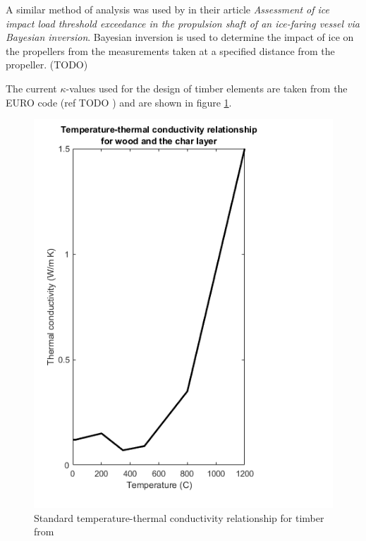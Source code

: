 	A similar method of analysis was used by \cite{DeKoker:2021} in their article \textit{Assessment of ice impact load threshold exceedance in the propulsion shaft of an ice-faring vessel via Bayesian inversion}. Bayesian inversion is used to determine the impact of ice on the propellers from the measurements taken at a specified distance from the propeller. (TODO)

	
	The current $\kappa$-values used for the design of timber elements are taken from the EURO code (ref TODO \citep{Euro:2004}) and are shown in figure \ref{kvalue_fig}.  
	\begin{figure}[H]
	\label{kvalue_fig}
	\centering
	\includegraphics[width = \linewidth]{figures/kvalues_euro.png}
	\caption{Standard temperature-thermal conductivity relationship for timber from \citep{Euro:2004}}
	\end{figure}
	
